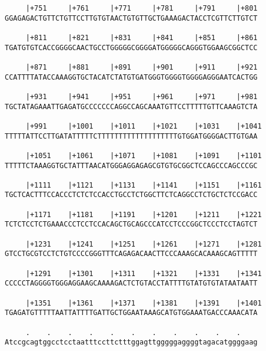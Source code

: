 \documentclass{article}
\begin{document}
\begin{Verbatim}
     |+751     |+761     |+771     |+781     |+791     |+801
GGAGAGACTGTTCTGTTCCTTGTGTAACTGTGTTGCTGAAAGACTACCTCGTTCTTGTCT
                                                            
     |+811     |+821     |+831     |+841     |+851     |+861
TGATGTGTCACCGGGGCAACTGCCTGGGGGCGGGGATGGGGGCAGGGTGGAAGCGGCTCC
                                                            
     |+871     |+881     |+891     |+901     |+911     |+921
CCATTTTATACCAAAGGTGCTACATCTATGTGATGGGTGGGGTGGGGAGGGAATCACTGG
                                                            
     |+931     |+941     |+951     |+961     |+971     |+981
TGCTATAGAAATTGAGATGCCCCCCCAGGCCAGCAAATGTTCCTTTTTGTTCAAAGTCTA
                                                            
     |+991     |+1001    |+1011    |+1021    |+1031    |+1041
TTTTTATTCCTTGATATTTTTCTTTTTTTTTTTTTTTTTTTGTGGATGGGGACTTGTGAA
                                                            
     |+1051    |+1061    |+1071    |+1081    |+1091    |+1101
TTTTTCTAAAGGTGCTATTTAACATGGGAGGAGAGCGTGTGCGGCTCCAGCCCAGCCCGC
                                                            
     |+1111    |+1121    |+1131    |+1141    |+1151    |+1161
TGCTCACTTTCCACCCTCTCTCCACCTGCCTCTGGCTTCTCAGGCCTCTGCTCTCCGACC
                                                            
     |+1171    |+1181    |+1191    |+1201    |+1211    |+1221
TCTCTCCTCTGAAACCCTCCTCCACAGCTGCAGCCCATCCTCCCGGCTCCCTCCTAGTCT
                                                            
     |+1231    |+1241    |+1251    |+1261    |+1271    |+1281
GTCCTGCGTCCTCTGTCCCCGGGTTTCAGAGACAACTTCCCAAAGCACAAAGCAGTTTTT
                                                            
     |+1291    |+1301    |+1311    |+1321    |+1331    |+1341
CCCCCTAGGGGTGGGAGGAAGCAAAAGACTCTGTACCTATTTTGTATGTGTATAATAATT
                                                            
     |+1351    |+1361    |+1371    |+1381    |+1391    |+1401
TGAGATGTTTTTAATTATTTTGATTGCTGGAATAAAGCATGTGGAAATGACCCAAACATA
                                                            
     .    .    .    .    .    .    .    .    .    .    .    
Atccgcagtggcctcctaatttccttctttggagttgggggaggggtagacatggggaag
                                                            

\end{Verbatim}
\end{document}
